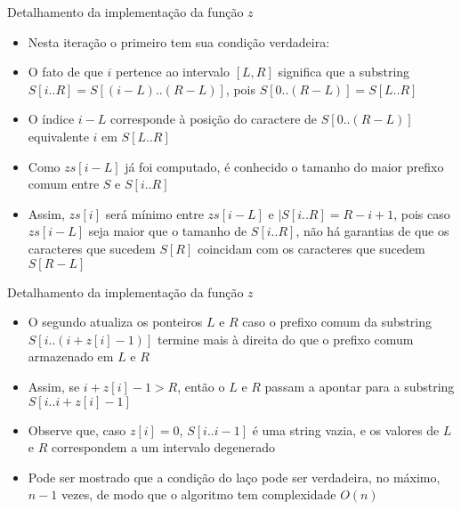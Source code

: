 \begin{frame}[fragile]{Detalhamento da implementação da função $z$}

    \begin{itemize}
        \item Nesta iteração o primeiro  tem sua condição verdadeira: 

        \vspace{0.1in}
        \vspace{0.1in}

        \item O fato de que $i$ pertence ao intervalo $[L, R]$ significa que a substring 
            $S[i..R] = S[(i-L)..(R-L)]$, pois $S[0..(R-L)] = S[L..R]$

        \item O índice $i-L$ corresponde à posição do caractere de $S[0..(R-L)]$ equivalente 
            $i$ em $S[L..R]$

        \item Como $zs[i-L]$ já foi computado, é conhecido o tamanho do maior prefixo comum entre 
            $S$ e $S[i..R]$

        \item Assim, $zs[i]$ será  mínimo entre $zs[i-L]$ e $|S[i..R] = R-i+1$, pois caso 
            $zs[i-L]$ seja maior que o tamanho de $S[i..R]$, não há garantias de que os caracteres
            que sucedem $S[R]$ coincidam com os caracteres que sucedem $S[R-L]$

    \end{itemize}

\end{frame}

\begin{frame}[fragile]{Detalhamento da implementação da função $z$}

    \begin{itemize}
        \item O segundo  atualiza os ponteiros $L$ e $R$ caso o prefixo
            comum da substring $S[i..(i+z[i]-1)]$ termine mais à direita do que o prefixo
            comum armazenado em $L$ e $R$

        \item Assim, se $i+z[i]-1 > R$, então o $L$ e $R$ passam a apontar para a substring 
            $S[i..i+z[i]-1]$

        \vspace{0.1in}
        \vspace{0.1in}

        \item Observe que, caso $z[i] = 0$, $S[i..i-1]$ é uma string vazia, e os valores de
            $L$ e $R$ correspondem a um intervalo degenerado

        \item Pode ser mostrado que a condição do laço  pode ser verdadeira, no
            máximo, $n - 1$ vezes, de modo que o algoritmo tem complexidade $O(n)$

    \end{itemize}

\end{frame}

